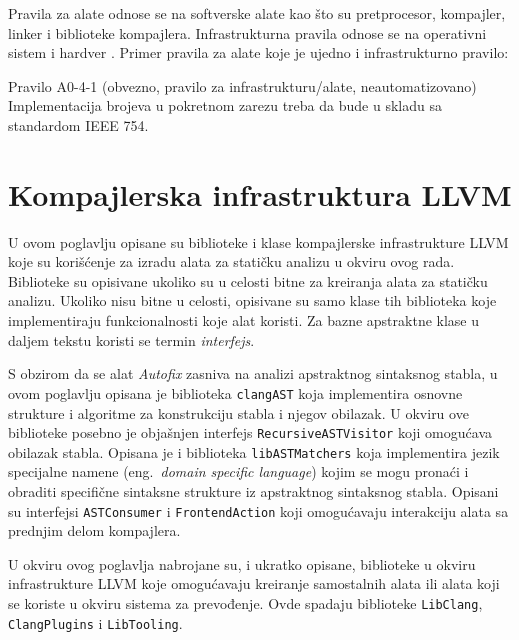 \documentclass[12pt,oneside]{memoir}
\begin{document}
Pravila za alate odnose se na softverske alate kao što su pretprocesor, kompajler, linker i biblioteke kompajlera.
Infrastrukturna pravila odnose se na operativni sistem i hardver \cite{AutosarGuidelines}.
Primer pravila za alate koje je ujedno i infrastrukturno pravilo:

\begin{center}
\begin{tcolorbox}
Pravilo A0-4-1 (obvezno, pravilo za infrastrukturu/alate, neautomatizovano) \\
Implementacija brojeva u pokretnom zarezu treba da bude u skladu sa standardom IEEE 754.
\end{tcolorbox}
\end{center}





\chapter{Kompajlerska infrastruktura LLVM}
\label{chp:llvm}

U ovom poglavlju opisane su biblioteke i klase kompajlerske infrastrukture LLVM koje su kori\v{s}\'{c}enje za izradu alata za stati\v{c}ku analizu u okviru ovog rada. Biblioteke su opisivane ukoliko su u celosti
bitne za kreiranja alata za stati\v{c}ku analizu. Ukoliko nisu bitne u celosti, opisivane su samo klase tih biblioteka koje implementiraju funkcionalnosti koje alat koristi. Za bazne apstraktne klase u daljem tekstu koristi se termin \textit{interfejs}. \par 
S obzirom da se alat \textit{Autofix} zasniva na analizi apstraktnog sintaksnog stabla, u ovom poglavlju opisana je biblioteka \texttt{clangAST} koja implementira osnovne
strukture i algoritme za konstrukciju stabla i njegov obilazak. U okviru ove biblioteke posebno je obja\v{s}njen interfejs \texttt{RecursiveASTVisitor} koji omogu\'{c}ava obilazak stabla.
Opisana je i biblioteka \texttt{libASTMatchers} koja implementira jezik specijalne namene (eng.~\textit{domain specific language}) kojim se mogu prona\'{c}i i obraditi specifi\v{c}ne sintaksne strukture iz apstraktnog sintaksnog stabla.
Opisani su interfejsi \texttt{ASTConsumer} i \texttt{FrontendAction} koji omogu\'{c}avaju interakciju alata sa prednjim delom kompajlera. \par
U okviru ovog poglavlja nabrojane su, i ukratko 
opisane, biblioteke u okviru infrastrukture LLVM koje omogu\'{c}avaju kreiranje samostalnih alata ili alata koji se koriste u okviru sistema za prevođenje. 
Ovde spadaju biblioteke \texttt{LibClang}, \texttt{ClangPlugins} i \texttt{LibTooling}.
\end{document}
